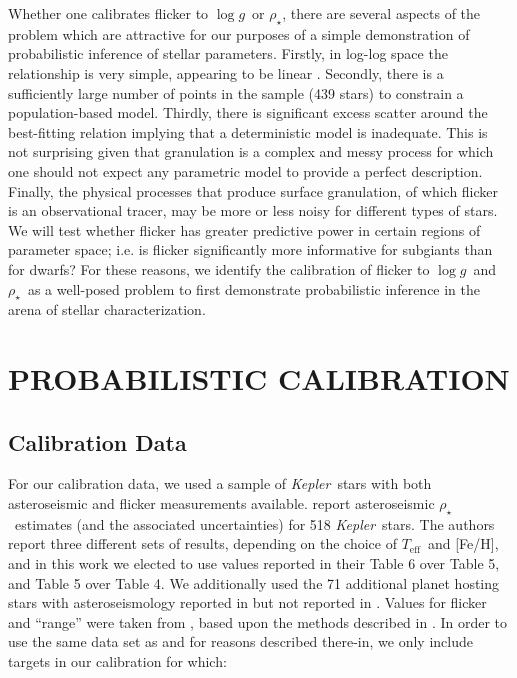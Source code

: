 \documentclass[apjl]{emulateapj}
\newcommand{\logg}{$\log g$}
\newcommand{\rhostar}{$\rho_{\star}$}
\newcommand{\Teff}{$T_{\mathrm{eff}}$}
\newcommand{\FeH}{[Fe/H]}
\newcommand{\Kepler}{\textit{Kepler}}
\begin{document}
Whether one calibrates flicker to \logg\ or \rhostar, there are several aspects
of the problem which are attractive for our purposes of a simple demonstration
of probabilistic inference of stellar parameters.
Firstly, in log-log space the relationship is very simple, appearing to be
linear \citep{kipping:2014}.
Secondly, there is a sufficiently large number of points in the sample (439
stars) to constrain a population-based model.
Thirdly, there is significant excess scatter around the best-fitting relation
implying that a deterministic model is inadequate.
This is not surprising given that granulation is a complex and messy process
for which one should not expect any parametric model to provide a perfect
description.
Finally, the physical processes that produce surface granulation, of which
flicker is an observational tracer, may be more or less noisy for different
types of stars.
We will test whether flicker has greater predictive power in certain regions
of parameter space; i.e. is flicker significantly more informative for
subgiants than for dwarfs?
For these reasons, we identify the calibration of
flicker to \logg\ and \rhostar\ as a well-posed problem to first demonstrate
probabilistic inference in the arena of stellar characterization.

\section{PROBABILISTIC CALIBRATION}
\label{sec:HBM}


\subsection{Calibration Data}

For our calibration data, we used a sample of \Kepler\ stars with
both asteroseismic and flicker measurements available. \citet{chaplin:2014}
report asteroseismic \rhostar\ estimates (and the associated uncertainties) for
518 \Kepler\ stars. The authors report three different sets of results,
depending on the choice of \Teff\ and \FeH, and in this work we elected to use
values reported in their Table 6 over Table 5, and Table 5 over Table 4. We
additionally used the 71 additional planet hosting stars with asteroseismology
reported in \citet{huber:2013} but not reported in \citet{chaplin:2014}. Values
for flicker and ``range'' were taken from \citet{kipping:2014}, based upon the
methods described in \citet{bastien:2013}.
In order to use the same data set as \citet{kipping:2014} and
for reasons described there-in, we only include targets in our calibration for
which:
\end{document}
